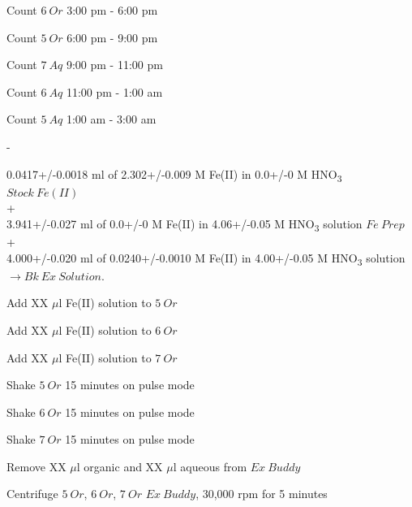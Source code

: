 \documentclass[idxtotoc,hyperref,openany,oneside]{labbook} %
\newcommand{\tsbs}{\textsubscript}
\begin{document}




\begin{todolist}
\item{Count $\boxed{6\ Or}$ 3:00 pm - 6:00 pm}
\item{Count $\boxed{5\ Or}$ 6:00 pm - 9:00 pm}
\item{Count $\boxed{7\ Aq}$ 9:00 pm - 11:00 pm}
\item{Count $\boxed{6\ Aq}$ 11:00 pm - 1:00 am}
\item{Count $\boxed{5\ Aq}$ 1:00 am - 3:00 am}
\end{todolist}
\begin{todolist}
\item{-}
\end{todolist}
\begin{center}
0.0417+/-0.0018 ml of 2.302+/-0.009 M Fe(II) in 0.0+/-0 M HNO\tsbs{3} $\boxed{Stock\ Fe(II)}$\\
+\\
3.941+/-0.027 ml of 0.0+/-0 M Fe(II) in 4.06+/-0.05 M HNO\tsbs{3} solution $\boxed{Fe\ Prep}$\\
+\\
4.000+/-0.020 ml of 0.0240+/-0.0010 M Fe(II) in 4.00+/-0.05 M HNO\tsbs{3} solution $\boxed{\rightarrow Bk\ Ex\ Solution}$.
\end{center}
\begin{todolist}
\item{Add XX $\mu$l Fe(II) solution to $\boxed{5\ Or}$}
\item{Add XX $\mu$l Fe(II) solution to $\boxed{6\ Or}$}
\item{Add XX $\mu$l Fe(II) solution to $\boxed{7\ Or}$}
\item{Shake $\boxed{5\ Or}$ 15 minutes on pulse mode}
\item{Shake $\boxed{6\ Or}$ 15 minutes on pulse mode}
\item{Shake $\boxed{7\ Or}$ 15 minutes on pulse mode}
\item{Remove XX $\mu$l organic and XX $\mu$l aqueous
  from $\boxed{Ex\ Buddy}$}
\item{Centrifuge $\boxed{5\ Or}$, $\boxed{6\ Or}$, $\boxed{7\ Or}$
  $\boxed{Ex\ Buddy}$, 30,000 rpm for 5 minutes}
\end{todolist}
\end{document}
